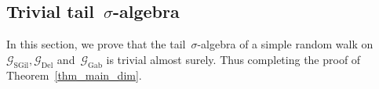 \documentclass[a4paper,11pt]{article}
\newcommand{\EE}{\mathbb{E}}
\newcommand{\PP}{\mathbb{P}}
\newcommand{\cm}[1]{{\color{blue} #1}}
\theoremstyle{definition}
\begin{document}



\subsection{Trivial tail~$\sigma$-algebra}\label{ss_trivial_tail_G}\label{ss_dim_2_trivial}
In this section, we prove that the tail~$\sigma$-algebra of a simple random walk on~$\mathcal G_\mathrm{SGil}, \mathcal G_\mathrm{Del}$ and~$\mathcal G_\mathrm{Gab}$ is trivial almost surely. Thus completing the proof of Theorem~\ref{thm_main_dim}. 
\end{document}
